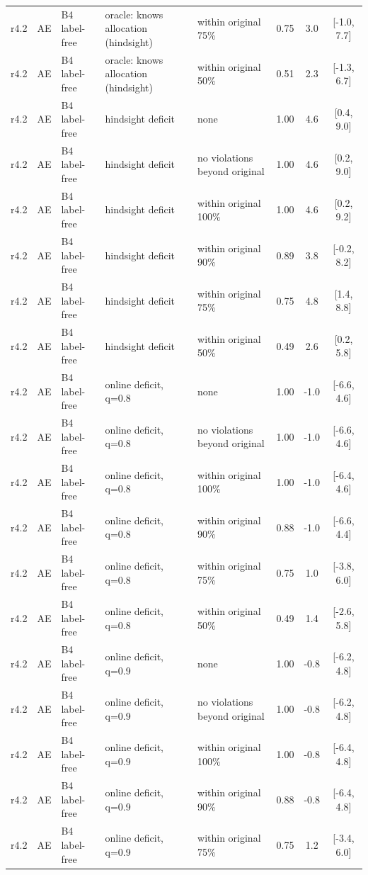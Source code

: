 \begin{longtable}{lllp{4.2cm}p{3.4cm}ccc}
r4.2 & AE & B4 label-free & oracle: knows allocation (hindsight) & within original 75\% & 0.75 & 3.0 & [-1.0, 7.7] \\
r4.2 & AE & B4 label-free & oracle: knows allocation (hindsight) & within original 50\% & 0.51 & 2.3 & [-1.3, 6.7] \\
r4.2 & AE & B4 label-free & hindsight deficit & none & 1.00 & 4.6 & [0.4, 9.0] \\
r4.2 & AE & B4 label-free & hindsight deficit & no violations beyond original & 1.00 & 4.6 & [0.2, 9.0] \\
r4.2 & AE & B4 label-free & hindsight deficit & within original 100\% & 1.00 & 4.6 & [0.2, 9.2] \\
r4.2 & AE & B4 label-free & hindsight deficit & within original 90\% & 0.89 & 3.8 & [-0.2, 8.2] \\
r4.2 & AE & B4 label-free & hindsight deficit & within original 75\% & 0.75 & 4.8 & [1.4, 8.8] \\
r4.2 & AE & B4 label-free & hindsight deficit & within original 50\% & 0.49 & 2.6 & [0.2, 5.8] \\
r4.2 & AE & B4 label-free & online deficit, q=0.8 & none & 1.00 & -1.0 & [-6.6, 4.6] \\
r4.2 & AE & B4 label-free & online deficit, q=0.8 & no violations beyond original & 1.00 & -1.0 & [-6.6, 4.6] \\
r4.2 & AE & B4 label-free & online deficit, q=0.8 & within original 100\% & 1.00 & -1.0 & [-6.4, 4.6] \\
r4.2 & AE & B4 label-free & online deficit, q=0.8 & within original 90\% & 0.88 & -1.0 & [-6.6, 4.4] \\
r4.2 & AE & B4 label-free & online deficit, q=0.8 & within original 75\% & 0.75 & 1.0 & [-3.8, 6.0] \\
r4.2 & AE & B4 label-free & online deficit, q=0.8 & within original 50\% & 0.49 & 1.4 & [-2.6, 5.8] \\
r4.2 & AE & B4 label-free & online deficit, q=0.9 & none & 1.00 & -0.8 & [-6.2, 4.8] \\
r4.2 & AE & B4 label-free & online deficit, q=0.9 & no violations beyond original & 1.00 & -0.8 & [-6.2, 4.8] \\
r4.2 & AE & B4 label-free & online deficit, q=0.9 & within original 100\% & 1.00 & -0.8 & [-6.4, 4.8] \\
r4.2 & AE & B4 label-free & online deficit, q=0.9 & within original 90\% & 0.88 & -0.8 & [-6.4, 4.8] \\
r4.2 & AE & B4 label-free & online deficit, q=0.9 & within original 75\% & 0.75 & 1.2 & [-3.4, 6.0] \\

\end{longtable}
